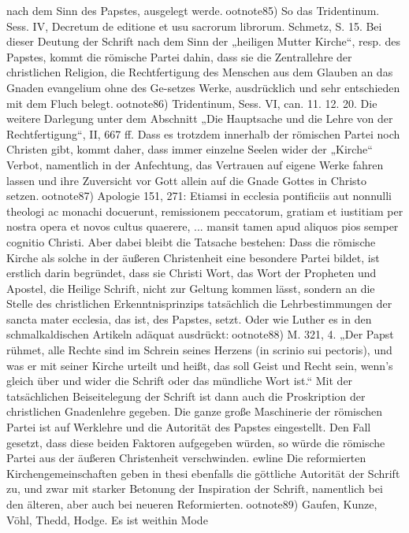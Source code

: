 nach dem Sinn des Papstes, ausgelegt werde.ootnote{85) So das Tridentinum. Sess. IV, Decretum de editione et usu sacrorum librorum. Schmetz, S. 15.} Bei dieser Deutung der Schrift nach dem Sinn der „heiligen Mutter Kirche“, resp. des Papstes, kommt die römische Partei dahin, dass sie die Zentrallehre der christlichen Religion, die Rechtfertigung des Menschen aus dem Glauben an das Gnaden evangelium ohne des Ge-setzes Werke, ausdrücklich und sehr entschieden mit dem Fluch belegt.ootnote{86) Tridentinum, Sess. VI, can. 11. 12. 20. Die weitere Darlegung unter dem Abschnitt „Die Hauptsache und die Lehre von der Rechtfertigung“, II, 667 ff.} Dass es trotzdem innerhalb der römischen Partei noch Christen gibt, kommt daher, dass immer einzelne Seelen wider der „Kirche“ Verbot, namentlich in der Anfechtung, das Vertrauen auf eigene Werke fahren lassen und ihre Zuversicht vor Gott allein auf die Gnade Gottes in Christo setzen.ootnote{87) Apologie 151, 271: Etiamsi in ecclesia pontificiis aut nonnulli theologi ac monachi docuerunt, remissionem peccatorum, gratiam et iustitiam per nostra opera et novos cultus quaerere, ... mansit tamen apud aliquos pios semper cognitio Christi.} Aber dabei bleibt die Tatsache bestehen: Dass die römische Kirche als solche in der äußeren Christenheit eine besondere Partei bildet, ist erstlich darin begründet, dass sie Christi Wort, das Wort der Propheten und Apostel, die Heilige Schrift, nicht zur Geltung kommen lässt, sondern an die Stelle des christlichen Erkenntnisprinzips tatsächlich die Lehrbestimmungen der sancta mater ecclesia, das ist, des Papstes, setzt. Oder wie Luther es in den schmalkaldischen Artikeln adäquat ausdrückt:ootnote{88) M. 321, 4.} „Der Papst rühmet, alle Rechte sind im Schrein seines Herzens (in scrinio sui pectoris), und was er mit seiner Kirche urteilt und heißt, das soll Geist und Recht sein, wenn’s gleich über und wider die Schrift oder das mündliche Wort ist.“ Mit der tatsächlichen Beiseitelegung der Schrift ist dann auch die Proskription der christlichen Gnadenlehre gegeben. Die ganze große Maschinerie der römischen Partei ist auf Werklehre und die Autorität des Papstes eingestellt. Den Fall gesetzt, dass diese beiden Faktoren aufgegeben würden, so würde die römische Partei aus der äußeren Christenheit verschwinden.
ewline Die reformierten Kirchengemeinschaften geben in thesi ebenfalls die göttliche Autorität der Schrift zu, und zwar mit starker Betonung der Inspiration der Schrift, namentlich bei den älteren, aber auch bei neueren Reformierten.ootnote{89) Gaufen, Kunze, Vöhl, Thedd, Hodge.} Es ist weithin Mode